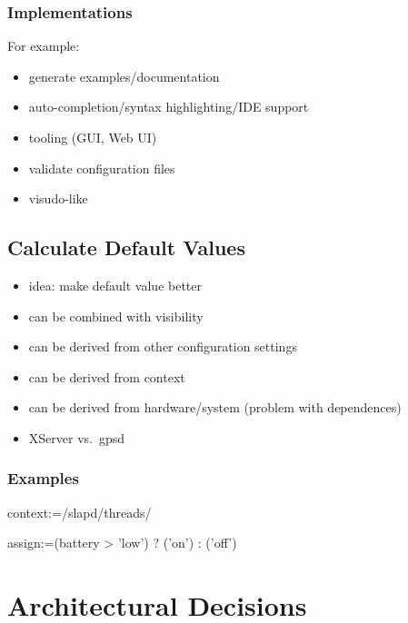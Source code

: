 \begin{frame}
	\frametitle{Implementations}
	For example:
	\begin{itemize}
	\item generate examples/documentation
	\item auto-completion/syntax highlighting/IDE support
	\item tooling (GUI, Web UI)
	\item validate configuration files
	\item visudo-like
	\end{itemize}
\end{frame}

\subsection{Calculate Default Values}

\begin{frame}
	\begin{itemize}
	\item idea: make default value better
	\item can be combined with visibility
	\pause
	\item can be derived from other configuration settings
	\item can be derived from context~\cite{raab2017introducing}
	\item can be derived from hardware/system (problem with dependences)
	\pause
	\item XServer vs.\ gpsd
	\end{itemize}
\end{frame}

\begin{frame}[fragile]
	\frametitle{Examples}
	\begin{code}
	context:=/slapd/threads/%
	\end{code}

	\begin{code}
	assign:=(battery > 'low') ? ('on') : ('off')
	\end{code}
\end{frame}



\section{Architectural Decisions}

